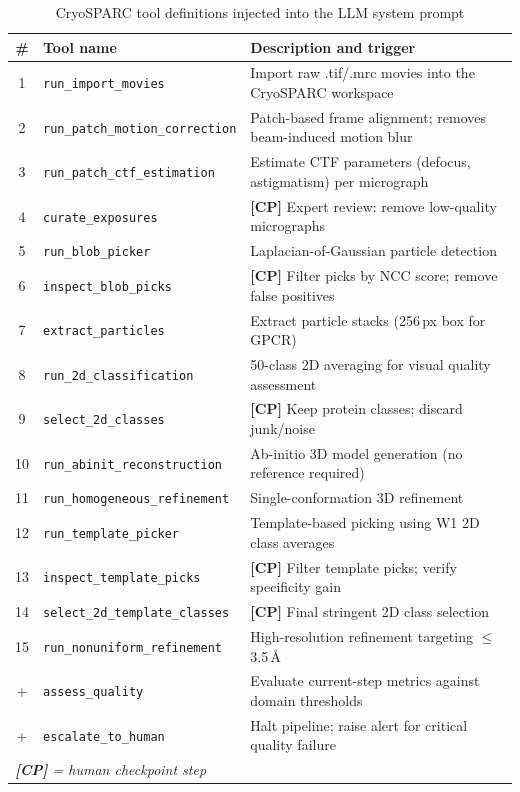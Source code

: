 \documentclass[12pt, a4paper]{article}
\begin{document}
\begin{table}[H]
\centering
\caption{CryoSPARC tool definitions injected into the LLM system prompt}
\label{tab:tools}
\small
\renewcommand{\arraystretch}{1.25}
\begin{tabular}{cl p{8.2cm}}
\toprule
\textbf{\#} & \textbf{Tool name} & \textbf{Description and trigger} \\
\midrule
1  & \texttt{run\_import\_movies}
   & Import raw .tif/.mrc movies into the CryoSPARC workspace \\
2  & \texttt{run\_patch\_motion\_correction}
   & Patch-based frame alignment; removes beam-induced motion blur \\
3  & \texttt{run\_patch\_ctf\_estimation}
   & Estimate CTF parameters (defocus, astigmatism) per micrograph \\
4  & \texttt{curate\_exposures}
   & \textbf{[CP]} Expert review: remove low-quality micrographs \\
5  & \texttt{run\_blob\_picker}
   & Laplacian-of-Gaussian particle detection \\
6  & \texttt{inspect\_blob\_picks}
   & \textbf{[CP]} Filter picks by NCC score; remove false positives \\
7  & \texttt{extract\_particles}
   & Extract particle stacks (256\,px box for GPCR) \\
8  & \texttt{run\_2d\_classification}
   & 50-class 2D averaging for visual quality assessment \\
9  & \texttt{select\_2d\_classes}
   & \textbf{[CP]} Keep protein classes; discard junk/noise \\
10 & \texttt{run\_abinit\_reconstruction}
   & Ab-initio 3D model generation (no reference required) \\
11 & \texttt{run\_homogeneous\_refinement}
   & Single-conformation 3D refinement \\
12 & \texttt{run\_template\_picker}
   & Template-based picking using W1 2D class averages \\
13 & \texttt{inspect\_template\_picks}
   & \textbf{[CP]} Filter template picks; verify specificity gain \\
14 & \texttt{select\_2d\_template\_classes}
   & \textbf{[CP]} Final stringent 2D class selection \\
15 & \texttt{run\_nonuniform\_refinement}
   & High-resolution refinement targeting $\leq$3.5\,\AA \\
+  & \texttt{assess\_quality}
   & Evaluate current-step metrics against domain thresholds \\
+  & \texttt{escalate\_to\_human}
   & Halt pipeline; raise alert for critical quality failure \\
\bottomrule
\multicolumn{3}{l}{\small\textit{\textbf{[CP]} = human checkpoint step}}
\end{tabular}
\end{table}
\end{document}
